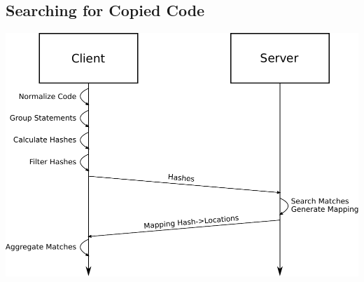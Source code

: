 \subsection{Searching for Copied Code}
\begin{frame}{\insertsubsection}
	\includegraphics[width=\linewidth]{../written/figures/searching_copied_code.pdf}
\end{frame}

